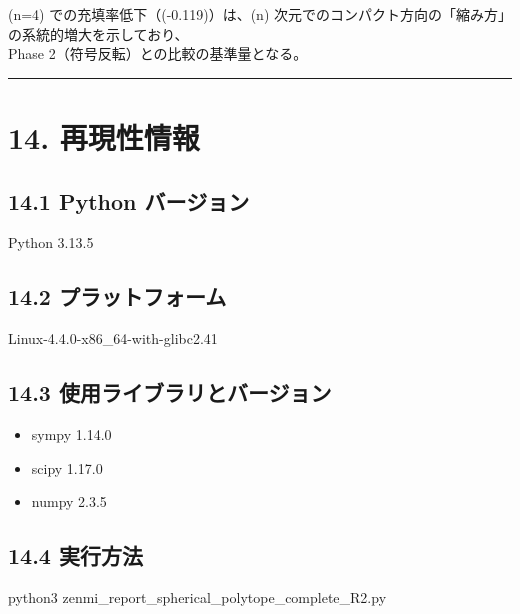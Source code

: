 \documentclass[
  12pt,
  a4paper,
]{article}
\newenvironment{Shaded}{}{}
\newcommand{\ExtensionTok}[1]{#1}
\newcommand{\NormalTok}[1]{#1}
\providecommand{\tightlist}{%
  \setlength{\itemsep}{0pt}\setlength{\parskip}{0pt}}
\begin{document}
(n=4) での充填率低下（(-0.119)）は、(n)
次元でのコンパクト方向の「縮み方」の系統的増大を示しており、\\
Phase 2（符号反転）との比較の基準量となる。

\begin{center}\rule{0.5\linewidth}{0.5pt}\end{center}

\section{14. 再現性情報}\label{ux518dux73feux6027ux60c5ux5831}

\subsection{14.1 Python
バージョン}\label{python-ux30d0ux30fcux30b8ux30e7ux30f3}

Python 3.13.5

\subsection{14.2
プラットフォーム}\label{ux30d7ux30e9ux30c3ux30c8ux30d5ux30a9ux30fcux30e0}

Linux-4.4.0-x86\_64-with-glibc2.41

\subsection{14.3
使用ライブラリとバージョン}\label{ux4f7fux7528ux30e9ux30a4ux30d6ux30e9ux30eaux3068ux30d0ux30fcux30b8ux30e7ux30f3}

\begin{itemize}
\tightlist
\item
  sympy 1.14.0
\item
  scipy 1.17.0
\item
  numpy 2.3.5
\end{itemize}

\subsection{14.4 実行方法}\label{ux5b9fux884cux65b9ux6cd5}

\begin{Shaded}
\begin{Highlighting}[]
\ExtensionTok{python3}\NormalTok{ zenmi\_report\_spherical\_polytope\_complete\_R2.py}
\end{Highlighting}
\end{Shaded}
\end{document}

